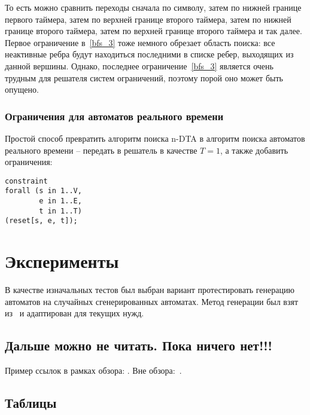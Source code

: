 \documentclass[times,specification,annotation]{itmo-student-thesis}
\begin{document}
То есть можно сравнить переходы сначала по символу, затем по нижней границе первого таймера, затем по верхней границе второго таймера, затем по нижней границе второго таймера, затем
по верхней границе второго таймера и так далее. Первое ограничение в~\ref{bfs_3} тоже немного обрезает область поиска: все неактивные ребра будут находиться последними в списке ребер,
выходящих из данной вершины. Однако, последнее ограничение~\ref{bfs_3} является очень трудным для решателя систем ограничений, поэтому порой оно может быть опущено.

\subsection{Ограничения для автоматов реального времени}

Простой способ превратить алгоритм поиска n-DTA в алгоритм поиска автоматов реального времени -- передать в решатель в качестве $T = 1$, а также добавить ограничения:

\begin{lstlisting}[float=!h,language=Mzn,caption={Ограничения RTA},label={rta_constraints}]
constraint
forall (s in 1..V,
        e in 1..E,
        t in 1..T)
(reset[s, e, t]);
\end{lstlisting}

\chapter{Эксперименты}

В качестве изначальных тестов был выбран вариант протестировать генерацию автоматов на случайных сгенерированных автоматах. Метод генерации был взят из~\cite{rti-plus} и адаптирован для текущих
нужд.

\section{Дальше можно не читать. Пока ничего нет!!!}

\startrelatedwork
Пример ссылок в рамках обзора: \cite{example-english, example-russian, unrestricted-jump-evco, doerr-doerr-lambda-lambda-self-adjustment-arxiv}.
\finishrelatedwork
Вне обзора:~\cite{bellman}.

\section{Таблицы}\label{sec:tables}
\end{document}
